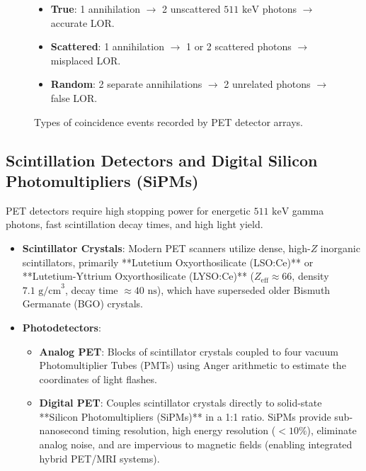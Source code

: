 \documentclass[11pt,a4paper]{article}
\begin{document}
\begin{figure}[htbp]
\centering
\begin{tcolorbox}[colback=blue!5!white,colframe=blue!70!black,arc=1mm,title=\sffamily Physical Coincidence Categories in PET]
\small
\begin{itemize}
    \item \textbf{True}: 1 annihilation $\to$ 2 unscattered $511\text{ keV}$ photons $\to$ accurate LOR.
    \item \textbf{Scattered}: 1 annihilation $\to$ 1 or 2 scattered photons $\to$ misplaced LOR.
    \item \textbf{Random}: 2 separate annihilations $\to$ 2 unrelated photons $\to$ false LOR.
\end{itemize}
\end{tcolorbox}
\caption{Types of coincidence events recorded by PET detector arrays.}
\label{fig:coincidence_types}
\end{figure}

\subsection{Scintillation Detectors and Digital Silicon Photomultipliers (SiPMs)}
PET detectors require high stopping power for energetic $511\text{ keV}$ gamma photons, fast scintillation decay times, and high light yield.
\begin{itemize}[leftmargin=*]
    \item \textbf{Scintillator Crystals}: Modern PET scanners utilize dense, high-$Z$ inorganic scintillators, primarily **Lutetium Oxyorthosilicate (LSO:Ce)** or **Lutetium-Yttrium Oxyorthosilicate (LYSO:Ce)** ($Z_{\text{eff}} \approx 66$, density $7.1\text{ g/cm}^3$, decay time $\approx 40\text{ ns}$), which have superseded older Bismuth Germanate (BGO) crystals.
    \item \textbf{Photodetectors}: 
    \begin{itemize}
        \item \textbf{Analog PET}: Blocks of scintillator crystals coupled to four vacuum Photomultiplier Tubes (PMTs) using Anger arithmetic to estimate the coordinates of light flashes.
        \item \textbf{Digital PET}: Couples scintillator crystals directly to solid-state **Silicon Photomultipliers (SiPMs)** in a 1:1 ratio. SiPMs provide sub-nanosecond timing resolution, high energy resolution ($<10\%$), eliminate analog noise, and are impervious to magnetic fields (enabling integrated hybrid PET/MRI systems).
    \end{itemize}
\end{itemize}
\end{document}
